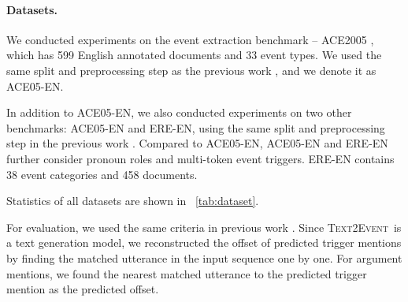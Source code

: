 \documentclass[11pt,a4paper]{article}
\newcommand\modelname{\textsc{Text2Event}}
\begin{document}
\paragraph{Datasets.}
We conducted experiments on the event extraction benchmark -- ACE2005 \citep{ace2005-annotation}, which has 599 English annotated documents and 33 event types.
We used the same split and preprocessing step as the previous work \citep{Zhang:2019:GAIL,wadden-etal-2019-entity,du-cardie-2020-event}, and we denote it as ACE05-EN.

In addition to ACE05-EN, we also conducted experiments on two other benchmarks: ACE05-EN and ERE-EN, using the same split and preprocessing step in the previous work \citep{lin-etal-2020-joint}.
Compared to ACE05-EN, ACE05-EN and ERE-EN further consider pronoun roles and multi-token event triggers.
ERE-EN contains 38 event categories and 458 documents.

Statistics of all datasets are shown in \tablename~\ref{tab:dataset}.

For evaluation, we used the same criteria in previous work \citep{Zhang:2019:GAIL,wadden-etal-2019-entity,lin-etal-2020-joint}.
Since \modelname\, is a text generation model, we reconstructed the offset of predicted trigger mentions by finding the matched utterance in the input sequence one by one.
For argument mentions, we found the nearest matched utterance to the predicted trigger mention as the predicted offset.
\end{document}
